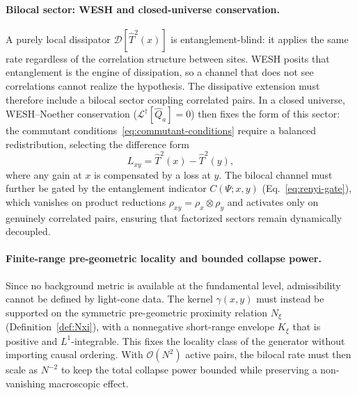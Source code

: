 \documentclass[12pt,a4paper]{article}
\numberwithin{equation}{section}
\begin{document}
\paragraph{Bilocal sector: WESH and closed-universe conservation.}
A purely local dissipator $\mathcal{D}[\hat T^2(x)]$ is entanglement-blind: it applies the same rate regardless of the correlation structure between sites. WESH posits that entanglement is the engine of dissipation, so a channel that does not see correlations cannot realize the hypothesis. The dissipative extension must therefore include a bilocal sector coupling correlated pairs. In a closed universe, WESH--Noether conservation ($\mathcal{L}^\dagger[\hat Q_a] = 0$) then fixes the form of this sector: the commutant conditions~\eqref{eq:commutant-conditions} require a balanced redistribution, selecting the difference form
\begin{equation}
L_{xy} = \hat T^2(x) - \hat T^2(y),
\label{eq:Lxy-def}
\end{equation}
where any gain at $x$ is compensated by a loss at $y$. The bilocal channel must further be gated by the entanglement indicator $C(\Psi;x,y)$ (Eq.~\eqref{eq:renyi-gate}), which vanishes on product reductions $\rho_{xy} = \rho_x \otimes \rho_y$ and activates only on genuinely correlated pairs, ensuring that factorized sectors remain dynamically decoupled.

\paragraph{Finite-range pre-geometric locality and bounded collapse power.}
Since no background metric is available at the fundamental level, admissibility cannot be defined by light-cone data. The kernel $\gamma(x,y)$ must instead be supported on the symmetric pre-geometric proximity relation $N_\xi$ (Definition~\ref{def:Nxi}), with a nonneg\-ative short-range envelope $K_\xi$ that is positive and $L^1$-integrable. This fixes the locality class of the generator without importing causal ordering. With $\mathcal{O}(N^2)$ active pairs, the bilocal rate must then scale as $N^{-2}$ to keep the total collapse power bounded while preserving a non-vanishing macroscopic effect.
\end{document}
